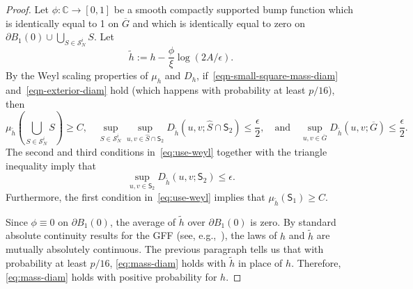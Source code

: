\documentclass[12pt]{amsart}
\numberwithin{equation}{section}
\begin{document}
\begin{proof}
		Let $\phi : \mathbb C\to [0,1]$ be a smooth compactly supported bump function which is identically equal to 1 on $\overline G$ and which is identically equal to zero on $\partial  B_1(0) \cup \bigcup_{S \in \mathcal  S_N^i} S$. Let
		\begin{equation}
		\tilde h := h - \frac{\phi}{\xi} \log(2 A /  \epsilon). 
		\end{equation}
		By the Weyl scaling properties of $\mu_h$ and $D_h$, if~\eqref{eqn-small-square-mass-diam} and~\eqref{eqn-exterior-diam} hold (which happens with probability at least $p/16$), then 
		\begin{equation} \label{eq:use-weyl}
		\mu_{\tilde h}\left(  \bigcup_{S\in \mathcal  S_N^i} S \right) \geq C ,\quad 
		\sup_{S\in\mathcal  S_N^i} \sup_{u,v\in  \hat S \cap \mathsf S_2  } D_{\tilde h}(u,v ; \hat S \cap \mathsf S_2   ) \leq \frac{\epsilon}{2} , \quad \text{and}\quad 
		\sup_{u,v\in \overline G} D_{\tilde h}(u,v;\overline G) \leq \frac{\epsilon}{2} .
		\end{equation}
		The second and third conditions in~\eqref{eq:use-weyl} together with the triangle inequality imply that
		\begin{equation} \label{eqn-shifted-field-weyl}
		\sup_{u,v\in \mathsf S_2 } D_{\tilde h}\left( u , v ;\mathsf S_2 \right) \leq \epsilon .
		\end{equation}
		Furthermore, the first condition in~\eqref{eq:use-weyl} implies that $\mu_{\tilde h}(\mathsf S_1) \geq C$. 
		
		Since $\phi\equiv 0$ on $\partial  B_1(0)$, the average of $\tilde h$ over $\partial  B_1(0)$ is zero. By standard absolute continuity results for the GFF (see, e.g.,~\cite[Proposition 2.9]{miller2017imaginary}), the laws of $h$ and $\tilde h$ are mutually absolutely continuous. The previous paragraph tells us that with probability at least $p/16$, \eqref{eq:mass-diam} holds with $\tilde h$ in place of $h$. Therefore, \eqref{eq:mass-diam} holds with positive probability for $h$.
	\end{proof}
	
\end{document}
